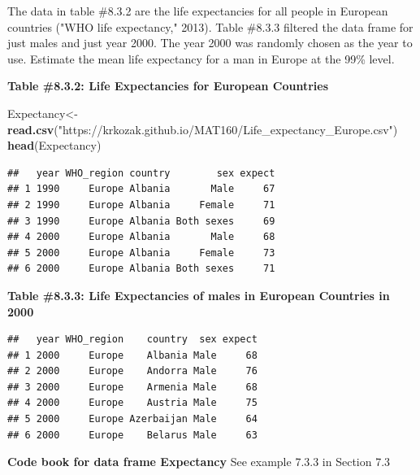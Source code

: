 \documentclass[
]{book}
\newenvironment{Shaded}{\begin{snugshade}}{\end{snugshade}}
\newcommand{\KeywordTok}[1]{\textcolor[rgb]{0.13,0.29,0.53}{\textbf{#1}}}
\newcommand{\NormalTok}[1]{#1}
\newcommand{\OperatorTok}[1]{\textcolor[rgb]{0.81,0.36,0.00}{\textbf{#1}}}
\newcommand{\StringTok}[1]{\textcolor[rgb]{0.31,0.60,0.02}{#1}}
\begin{document}
The data in table \#8.3.2 are the life expectancies for all people in European countries ("WHO life expectancy," 2013). Table \#8.3.3 filtered the data frame for just males and just year 2000. The year 2000 was randomly chosen as the year to use. Estimate the mean life expectancy for a man in Europe at the 99\% level.

\textbf{Table \#8.3.2: Life Expectancies for European Countries}

\begin{Shaded}
\begin{Highlighting}[]
\NormalTok{Expectancy<-}\KeywordTok{read.csv}\NormalTok{(}\StringTok{"https://krkozak.github.io/MAT160/Life_expectancy_Europe.csv"}\NormalTok{)}
\KeywordTok{head}\NormalTok{(Expectancy)}
\end{Highlighting}
\end{Shaded}

\begin{verbatim}
##   year WHO_region country        sex expect
## 1 1990     Europe Albania       Male     67
## 2 1990     Europe Albania     Female     71
## 3 1990     Europe Albania Both sexes     69
## 4 2000     Europe Albania       Male     68
## 5 2000     Europe Albania     Female     73
## 6 2000     Europe Albania Both sexes     71
\end{verbatim}

\textbf{Table \#8.3.3: Life Expectancies of males in European Countries in 2000}

\begin{Shaded}
\end{Shaded}

\begin{verbatim}
##   year WHO_region    country  sex expect
## 1 2000     Europe    Albania Male     68
## 2 2000     Europe    Andorra Male     76
## 3 2000     Europe    Armenia Male     68
## 4 2000     Europe    Austria Male     75
## 5 2000     Europe Azerbaijan Male     64
## 6 2000     Europe    Belarus Male     63
\end{verbatim}

\textbf{Code book for data frame Expectancy} See example 7.3.3 in Section 7.3
\end{document}
